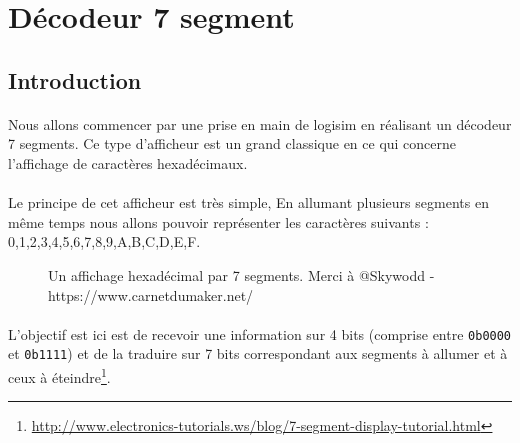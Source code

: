\section{Décodeur 7 segment}
\subsection{Introduction}
\paragraph{}
Nous allons commencer par une prise en main de logisim en réalisant un décodeur 7 segments. Ce type d'afficheur est un grand classique en ce qui concerne l'affichage de caractères hexadécimaux.

\paragraph{}
Le principe de cet afficheur est très simple, En allumant plusieurs segments en même temps nous allons pouvoir représenter les caractères suivants :
0,1,2,3,4,5,6,7,8,9,A,B,C,D,E,F.

\begin{figure}[H]
	\caption{Un affichage hexadécimal par 7 segments. Merci à @Skywodd - https://www.carnetdumaker.net/}
\end{figure}

\paragraph{}
L'objectif est ici est de recevoir une information sur 4 bits (comprise entre \texttt{0b0000} et \texttt{0b1111}) et de la traduire sur 7 bits correspondant aux segments à allumer et à ceux à éteindre\footnote{\url{http://www.electronics-tutorials.ws/blog/7-segment-display-tutorial.html}}.

